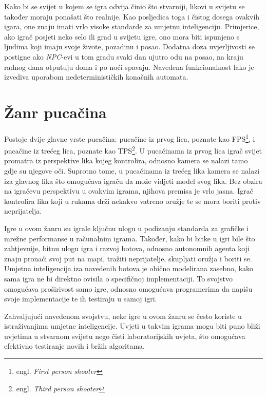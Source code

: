 \documentclass[times, utf8, zavrsni, numeric]{fer}
\begin{document}
\par Kako bi se svijet u kojem se igra odvija činio što stvarniji, likovi u svijetu se također moraju ponašati što realnije.
Kao posljedica toga i čistog dosega ovakvih igara, one znaju imati vrlo visoke standarde za umjetnu inteligenciju.
Primjerice, ako igrač posjeti neko selo ili grad u svijetu igre, ono mora biti ispunjeno s ljudima koji imaju svoje živote, pozadinu i posao.
Dodatna doza uvjerljivosti se postigne ako \textit{NPC}-evi u tom gradu svaki dan ujutro odu na posao, na kraju radnog dana otputuju doma i po noći spavaju.
Navedena funkcionalnost lako je izvediva uporabom nedeterminističkih konačnih automata\cite{book:AIGameProgrammingWisdom}.

\section{Žanr pucačina}

\par Postoje dvije glavne vrste pucačina: pucačine iz prvog lica, poznate kao FPS\footnote{engl. \textit{First person shooter}}, i pucačine iz trećeg lica, poznate kao TPS\footnote{engl. \textit{Third person shooter}}.
U pucačinama iz prvog lica igrač svijet promatra iz perspektive lika kojeg kontrolira, odnosno kamera se nalazi tamo gdje su njegove oči.
Suprotno tome, u pucačinama iz trećeg lika kamera se nalazi iza glavnog lika što omogućava igraču da može vidjeti model svog lika.
Bez obzira na igračevu perspektivu u ovakvim igrama, njihova premisa je vrlo jasna.
Igrač kontrolira lika koji u rukama drži nekakvo vatreno oružje te se mora boriti protiv neprijatelja.

\par Igre u ovom žanru su igrale ključnu ulogu u podizanju standarda za grafičke i mrežne performanse u računalnim igrama.
Također, kako bi bitke u igri bile što zahtjevnije, bitnu ulogu igra i razvoj botova, odnosno autonomnih agenta koji znaju pronaći svoj put na mapi, tražiti neprijatelje, skupljati oružja i boriti se.
Umjetna inteligencija iza navedenih botova je obično modelirana zasebno, kako sama igra ne bi direktno ovisila o specifičnoj implementaciji.
To svojstvo omogućava proširivost samo igre, odnosno omogućava programerima da napišu svoje implementacije te ih testiraju u samoj igri.

\par Zahvaljujući navedenom svojstvu, neke igre u ovom žanru se često koriste u istraživanjima umjetne inteligencije.
Uvjeti u takvim igrama mogu biti puno bliži uvjetima u stvarnom svijetu nego čisti laboratorijskih uvjeta, što omogućava efektivno testiranje novih i bržih algoritama.
\end{document}
